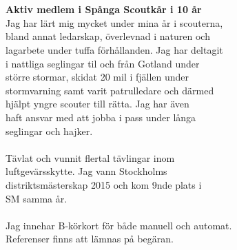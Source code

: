 \documentclass[11pt,oneside,a4paper,titlepage]{article}
\begin{document}
\begin{tcolorbox}
    \begin{minipage}[t]{2cm}
        \begin{tcolorbox}[colframe=white,colback=white]
            
        \end{tcolorbox}
    \end{minipage}
    \begin{minipage}[t]{15cm}
        \begin{tcolorbox}[colframe=white,colback=white]
            {\selectfont
                \\
                \\\textbf{Aktiv medlem i Spånga Scoutkår i 10 år}\\
                Jag har lärt mig mycket under mina år i scouterna,\\
                bland annat ledarskap, överlevnad i naturen och\\
                lagarbete under tuffa förhållanden. Jag har deltagit\\
                i nattliga seglingar til och från Gotland under\\
                större stormar, skidat 20 mil i fjällen under\\
                stormvarning samt varit patrulledare och därmed\\
                hjälpt yngre scouter till rätta. Jag har även\\
                haft ansvar med att jobba i pass under långa\\
                seglingar och hajker.\\\\
                Tävlat och vunnit flertal tävlingar inom\\
                luftgevärsskytte. Jag vann Stockholms\\
                distriktsmästerskap 2015 och kom 9nde plats i\\
                SM samma år.\\\\
                Jag innehar B-körkort för både manuell och automat.\\

                Referenser finns att lämnas på begäran.
            }
        \end{tcolorbox}
    \end{minipage}
\end{tcolorbox}
\end{document}
